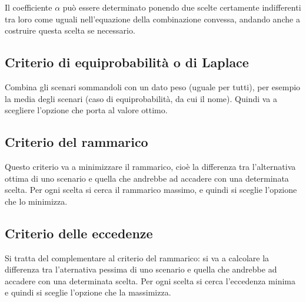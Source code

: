 \documentclass[\main/main.tex]{subfiles}
\begin{document}
Il coefficiente $\alpha$ può essere determinato ponendo due scelte certamente indifferenti tra loro come uguali nell'equazione della combinazione convessa, andando anche a costruire questa scelta se necessario.

\subsection{Criterio di equiprobabilità o di Laplace}
Combina gli scenari sommandoli con un dato peso (uguale per tutti), per esempio la media degli scenari (caso di equiprobabilità, da cui il nome). Quindi va a scegliere l'opzione che porta al valore ottimo.

\subsection{Criterio del rammarico}
Questo criterio va a minimizzare il rammarico, cioè la differenza tra l'alternativa ottima di uno scenario e quella che andrebbe ad accadere con una determinata scelta. Per ogni scelta si cerca il rammarico massimo, e quindi si sceglie l'opzione che lo minimizza.

\subsection{Criterio delle eccedenze}
Si tratta del complementare al criterio del rammarico: si va a calcolare la differenza tra l'aternativa pessima di uno scenario e quella che andrebbe ad accadere con una determinata scelta. Per ogni scelta si cerca l'eccedenza minima e quindi si sceglie l'opzione che la massimizza.
\end{document}
